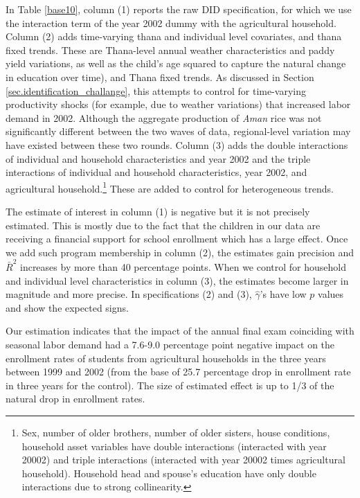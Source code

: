 \documentclass[12pt,letterpaper]{article}\usepackage[margin=1in]{geometry}
\newcommand{\0}{\ensuremath{\mbox{\boldmath $0$}}}
\begin{document}
In Table \ref{base10}, column (1) reports the raw DID specification, for which we use the interaction term of the year 2002 dummy with the agricultural household. Column (2) adds time-varying thana and individual level covariates, and thana fixed trends. These are Thana-level annual weather characteristics and paddy yield variations, as well as the child's age squared to capture the natural change in education over time), and Thana fixed trends. As discussed in Section \ref{sec.identification_challange}, this attempts to control for time-varying productivity shocks (for example, due to weather variations) that increased labor demand in 2002. Although the aggregate production of \textit{Aman} rice was not significantly different between the two waves of data, regional-level variation may have existed between these two rounds. Column (3) adds the double interactions of individual and household characteristics and year 2002 and the triple interactions of individual and household characteristics, year 2002, and agricultural household.\footnote{Sex, number of older brothers, number of older sisters, house conditions, household asset variables have double interactions (interacted with year 20002) and triple interactions (interacted with year 20002 times agricultural household). Household head and spouse's education have only double interactions due to strong collinearity. } These are added to control for heterogeneous trends. 

The estimate of interest in column (1) is negative but it is not precisely estimated. This is mostly due to the fact that the children in our data are receiving a financial support for school enrollment which has a large effect. Once we add such program membership in column (2), the estimates gain precision and $\bar{R}^{2}$ increases by more than 40 percentage points. When we control for household and individual level characteristics in column (3), the estimates become larger in magnitude and more precise. In specifications (2) and (3), $\hat{\gamma}$'s have low $p$ values and show the expected signs. 

Our estimation indicates that the impact of the annual final exam coinciding with seasonal labor demand had a 7.6-9.0 percentage point negative impact on the enrollment rates of students from agricultural households in the three years between 1999 and 2002 (from the base of 25.7 percentage drop in enrollment rate in three years for the control). The size of estimated effect is up to 1/3 of the natural drop in enrollment rates. 
\end{document}
